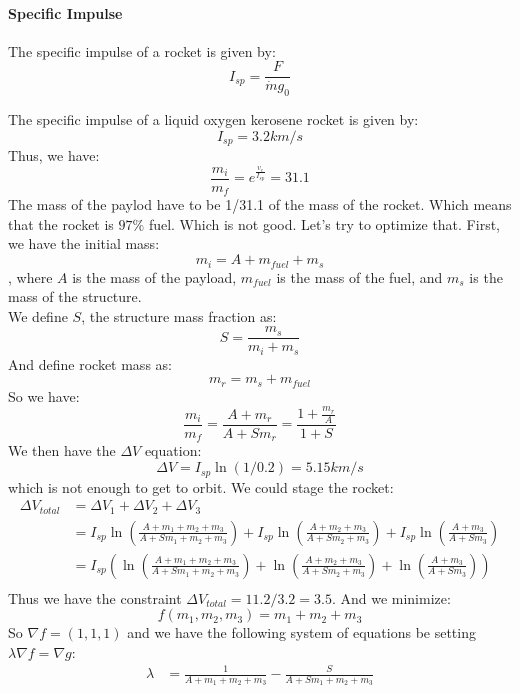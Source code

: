 \documentclass[11pt]{article}
\begin{document}
\paragraph{Specific Impulse} The specific impulse of a rocket is given by:
\begin{equation}
    I_{sp} = \frac{F}{\dot{m}g_0}
\end{equation}
\begin{example}
    The specific impulse of a liquid oxygen kerosene rocket is given by:
    $$
        I_{sp} = 3.2 km/s
    $$
    Thus, we have:
    $$
    \frac{m_i}{m_f} = e^{\frac{v_e}{I_{sp}}} = 31.1
    $$
    The mass of the paylod have to be 1/31.1 of the mass of the rocket. Which means that the rocket is $97\%$ fuel. Which is not good. Let's try to optimize that. First, we have the initial mass:
    $$
    m_i = A + m_{fuel} + m_s
    $$
    , where $A$ is the mass of the payload, $m_{fuel}$ is the mass of the fuel, and $m_s$ is the mass of the structure.\\
    We define $S$, the structure mass fraction as:
    $$
    S = \frac{m_s}{m_i + m_s}
    $$
    And define rocket mass as:
    $$
    m_r = m_s + m_{fuel}
    $$
    So we have:
    $$
        \frac{m_i}{m_f} = \frac{A + m_r}{A + Sm_r} = \frac{1 + \frac{m_r}{A}}{1 + S}
    $$
    We then have the $\Delta V$ equation:
    $$
    \Delta V = I_{sp} \ln(1/0.2) = 5.15 km/s
    $$
    which is not enough to get to orbit. We could stage the rocket:
    \begin{align*}
        \Delta V_{total} &= \Delta V_1 + \Delta V_2 + \Delta V_3 \\
        &= I_{sp} \ln \left( \frac{A + m_1 + m_2 + m_3}{A + Sm_1 + m_2 + m_3} \right) + I_{sp} \ln \left( \frac{A + m_2 + m_3}{A + Sm_2 + m_3} \right) + I_{sp} \ln \left( \frac{A + m_3}{A + Sm_3} \right) \\
        &= I_{sp} (\ln \left( \frac{A + m_1 + m_2 + m_3}{A + Sm_1 + m_2 + m_3} \right) + \ln \left( \frac{A + m_2 + m_3}{A + Sm_2 + m_3} \right) + \ln \left( \frac{A + m_3}{A + Sm_3} \right) ) \\
    \end{align*}
    Thus we have the constraint $\Delta V_{total} = 11.2 / 3.2 = 3.5$. And we minimize:
    $$
    f(m_1, m_2, m_3) = m_1 + m_2 + m_3
    $$
    So $\nabla f = (1, 1, 1)$ and we have the following system of equations be setting $\lambda \nabla f = \nabla g$:
    \begin{align*}
       \lambda &= \frac{1}{A + m_1 + m_2 + m_3} - \frac{S}{A + Sm_1 + m_2 + m_3} \\

\end{align*}
\end{example}
\end{document}
